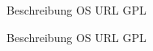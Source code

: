 \documentclass[12pt,a4paper,landscape,twocolumn]{article}
\begin{document}


{Beschreibung}
{OS}
{URL}
{GPL}


\newpage %


{Beschreibung}
{OS}
{URL}
{GPL}
\end{document}

